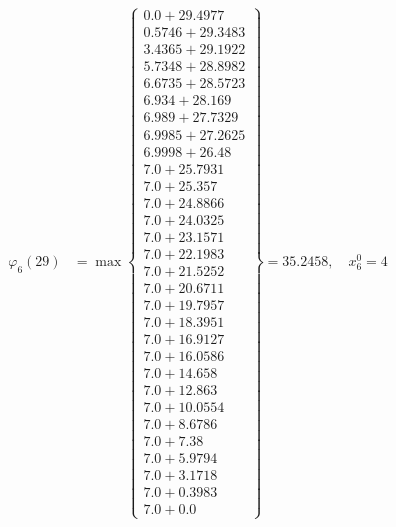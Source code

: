 \documentclass{article}
\begin{document}
\begin{align*}
  
\varphi_{6}(29) &= \max \left\{ \begin{array}{c}
0.0 + 29.4977 \\
 0.5746 + 29.3483 \\
 3.4365 + 29.1922 \\
 5.7348 + 28.8982 \\
 6.6735 + 28.5723 \\
 6.934 + 28.169 \\
 6.989 + 27.7329 \\
 6.9985 + 27.2625 \\
 6.9998 + 26.48 \\
 7.0 + 25.7931 \\
 7.0 + 25.357 \\
 7.0 + 24.8866 \\
 7.0 + 24.0325 \\
 7.0 + 23.1571 \\
 7.0 + 22.1983 \\
 7.0 + 21.5252 \\
 7.0 + 20.6711 \\
 7.0 + 19.7957 \\
 7.0 + 18.3951 \\
 7.0 + 16.9127 \\
 7.0 + 16.0586 \\
 7.0 + 14.658 \\
 7.0 + 12.863 \\
 7.0 + 10.0554 \\
 7.0 + 8.6786 \\
 7.0 + 7.38 \\
 7.0 + 5.9794 \\
 7.0 + 3.1718 \\
 7.0 + 0.3983 \\
 7.0 + 0.0
\end{array} \right\}=35.2458,\quad x_{6}^0=4\\
  
  
  

\end{align*}
\end{document}
